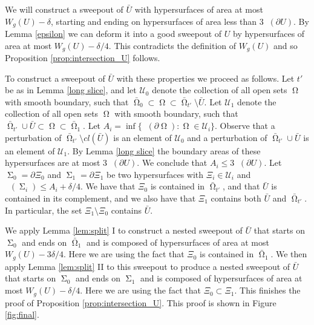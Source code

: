 \documentclass[12pt]{amsart}
\DeclareMathOperator{\Hn}{\mathcal{H}^n}
\DeclareMathOperator{\Om}{\Omega}
\DeclareMathOperator{\Si}{\Sigma}
\theoremstyle{definition}
\begin{document}

We will construct a sweepout of
$\bar{U}$
with hypersurfaces of area at most
$W_{g}(U) - \delta$, starting and ending on hypersurfaces of area
less than $3 \Hn(\partial U)$.
By Lemma \ref*{epsilon} we can deform it into
a good sweepout of $U$
by hypersurfaces of area at most $W_{g}(U) - \delta/4$.
This contradicts the definition of $W_{g}(U)$ 
and so Proposition \ref*{prop:intersection_U} follows.

To construct a sweepout of $\bar{U}$
with these properties we proceed as follows.
Let $t'$ be as in Lemma \ref*{long slice}, and
let $\mathcal{U}_0$ denote the collection
of all open sets $\Om$ with smooth boundary,
such that $\bar{\Om}_0 \subset \Om \subset \bar{\Om}_{t'} \setminus \bar{U}$.
Let $\mathcal{U}_1$ denote the collection
of all open sets $\Om$ with smooth boundary,
such that $\bar{\Om}_{t'} \cup \bar{U} \subset \Om \subset \bar{\Om}_1$.
Let $A_i = \inf \{\Hn(\partial \Om): 
\Om \in \mathcal{U}_i\}$. 
Observe that a perturbation of $\bar{\Om}_{t'} \setminus cl(\bar{U})$
 is an element of $ \mathcal{U}_0$ and 
a perturbation of $\bar{\Om}_{t'} \cup \bar{U}$ is an element of
$\mathcal{U}_1$. By Lemma \ref*{long slice}
the boundary areas of these hypersurfaces are at most $3 \Hn(\partial U)$.
We conclude that
$A_i \leq 3 \Hn(\partial U)$.
Let $\Si_0 = \partial \Xi_0$  and $\Si_1 = \partial \Xi_1$
be two hypersurfaces with 
$\Xi_i \in \mathcal{U}_i$ and
$\Hn(\Si_i) \leq A_i + \delta/4$.  We have that $\Xi_0$ is contained in $\bar{\Om}_{t'}$,
and that $\bar{U}$ is contained in its complement, and we also have that $\Xi_1$
contains both $\bar{U}$ and $\bar{\Om}_{t'}$.  In particular, the set $\Xi_1 \setminus \Xi_0$
contains $\bar{U}$.

We apply Lemma \ref*{lem:split} I
to construct a nested sweepout of $\bar{U}$ that starts on $\Si_0$ and ends on $\bar{\Om}_1$ and is composed of
hypersurfaces of area at most $W_{g}(U) - 3 \delta/4$.  Here we are using the fact that $\Xi_0$ is contained in
$\bar{\Om}_1$.  We then apply Lemma \ref*{lem:split} II to this sweepout to produce a nested sweepout of $\bar{U}$
that starts on $\Si_0$ and ends on $\Si_1$ and is composed of hypersurfaces of area at most 
$W_{g}(U) - \delta/4$.  Here we are using the fact that $\Xi_0 \subset \Xi_1$.
This finishes the proof of Proposition \ref*{prop:intersection_U}.  This proof is shown
in Figure \ref*{fig:final}.
\end{document}
